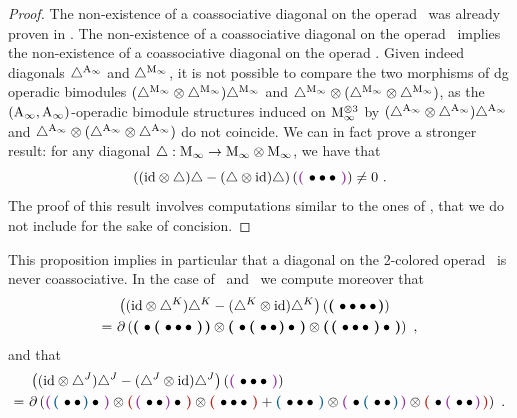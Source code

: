 \documentclass[twoside, 12pt]{amsart}
\theoremstyle{remark}
\begin{document}
\begin{proof}
The non-existence of a coassociative diagonal on the operad \Ainf\ was already proven in \cite[Section 6]{MarklShnider06}.
The non-existence of a coassociative diagonal on the operad \Ainf\ implies the non-existence of a coassociative diagonal on the operad \Minf . 
Given indeed diagonals $\triangle^{\mathrm{A}_\infty}$ and $\triangle^{\mathrm{M}_\infty}$, it is not possible to compare the two morphisms of dg operadic bimodules $ ( \triangle^{\mathrm{M}_\infty} \otimes \triangle^{\mathrm{M}_\infty} ) \triangle^{\mathrm{M}_\infty}$ and $\triangle^{\mathrm{M}_\infty} \otimes (\triangle^{\mathrm{M}_\infty} \otimes \triangle^{\mathrm{M}_\infty} )$, as the $(\mathrm{A}_\infty , \mathrm{A}_\infty)$-operadic bimodule structures induced on $\mathrm{M}_\infty^{\otimes 3}$ by $ ( \triangle^{\mathrm{A}_\infty} \otimes \triangle^{\mathrm{A}_\infty} ) \triangle^{\mathrm{A}_\infty}$ and $\triangle^{\mathrm{A}_\infty} \otimes (\triangle^{\mathrm{A}_\infty} \otimes \triangle^{\mathrm{A}_\infty} )$ do not coincide.
We can in fact prove a stronger result:  for any diagonal $\triangle : \mathrm{M}_\infty \to \mathrm{M}_\infty \otimes \mathrm{M}_\infty$, we have that
\[ \left( (\ide \otimes \triangle ) \triangle - (\triangle \otimes \ide) \triangle \right) \left( \purple{\bullet \bullet \bullet} \right) \neq 0 \ . \]
The proof of this result involves computations similar to the ones of \cite[Section 6]{MarklShnider06}, that we do not include for the sake of concision. 
\end{proof}

\noindent This proposition implies in particular that a diagonal on the 2-colored operad \Ainfdeux\ is never coassociative.
In the case of \diagainf\ and \diagminf\ we compute moreover that
  \begin{align*}
      &\left( (\mathrm{id} \otimes \triangle^{K} ) \triangle^{K} - (\triangle^{K} \otimes \mathrm{id}) \triangle^{K} \right) \left( \boldsymbol{\left(\right.}  \bullet \bullet \bullet \bullet  \boldsymbol{\left.\right)} \right)  \\
      = \  &\partial \left( \boldsymbol{\left(\right.}  \bullet \boldsymbol{\left(\right.}  \bullet \bullet \bullet  \boldsymbol{\left.\right)}  \boldsymbol{\left.\right)} \otimes \boldsymbol{\left(\right.}  \bullet \boldsymbol{\left(\right.}  \bullet \bullet  \boldsymbol{\left.\right)} \bullet  \boldsymbol{\left.\right)} \otimes \boldsymbol{\left(\right.}  \boldsymbol{\left(\right.}  \bullet \bullet \bullet  \boldsymbol{\left.\right)} \bullet  \boldsymbol{\left.\right)}  \right) \ ,
  \end{align*}
and that 
\begin{align*}
      &\left( (\ide \otimes \diagminf ) \diagminf - (\diagminf \otimes \ide) \diagminf \right) \left( \purple{\bullet \bullet \bullet} \right)  \\
      = \ &\partial \left(
  \purple{\blue{\bullet \bullet} \bullet} \otimes \red{\purple{\bullet \bullet} \bullet} \otimes \red{\bullet \bullet \bullet}
  + \blue{\bullet \bullet \bullet} \otimes \purple{ \bullet \blue{\bullet \bullet}} \otimes \red{\bullet \purple{\bullet \bullet}}
  \right) \ .
\end{align*} 
  
\end{document}
